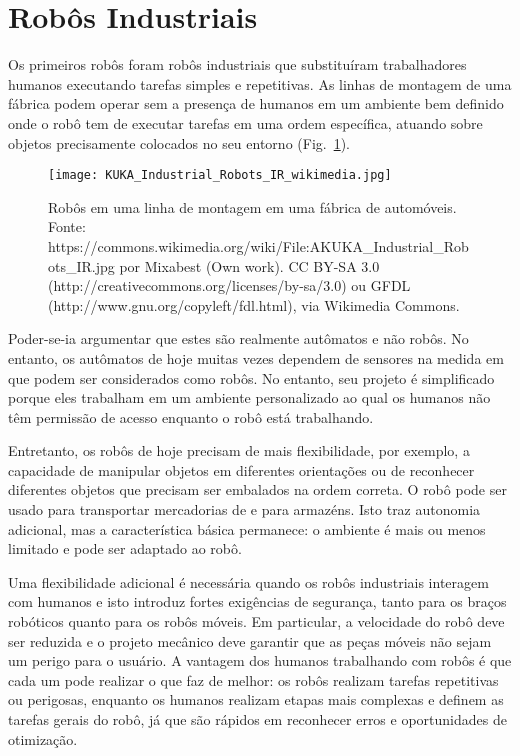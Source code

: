 \section{Robôs Industriais}

Os primeiros robôs foram robôs industriais que substituíram trabalhadores humanos executando tarefas simples e repetitivas. As linhas de montagem de uma fábrica podem operar sem a presença de humanos em um ambiente bem definido onde o robô tem de executar tarefas em uma ordem específica, atuando sobre objetos precisamente colocados no seu entorno (Fig.~\ref{fig.assemblyline}). 

\begin{figure}
\begin{center}
\texttt{[image: KUKA\_Industrial\_Robots\_IR\_wikimedia.jpg]}
\end{center}
\caption{Robôs em uma linha de montagem em uma fábrica de automóveis. Fonte: https://commons.wikimedia.org/wiki/File:AKUKA\_Industrial\_Robots\_IR.jpg por Mixabest (Own work). CC BY-SA 3.0 (http://creativecommons.org/licenses/by-sa/3.0) ou GFDL (http://www.gnu.org/copyleft/fdl.html), via Wikimedia Commons.}\label{fig.assemblyline}
\end{figure}

Poder-se-ia argumentar que estes são realmente autômatos e não robôs. No entanto, os autômatos de hoje muitas vezes dependem de sensores na medida em que podem ser considerados como robôs. No entanto, seu projeto é simplificado porque eles trabalham em um ambiente personalizado ao qual os humanos não têm permissão de acesso enquanto o robô está trabalhando.

Entretanto, os robôs de hoje precisam de mais flexibilidade, por exemplo, a capacidade de manipular objetos em diferentes orientações ou de reconhecer diferentes objetos que precisam ser embalados na ordem correta. O robô pode ser usado para transportar mercadorias de e para  armazéns. Isto traz autonomia adicional, mas a característica básica permanece: o ambiente é mais ou menos limitado e pode ser adaptado ao robô.

Uma flexibilidade adicional é necessária quando os robôs industriais interagem com humanos e isto introduz fortes exigências de segurança, tanto para os braços robóticos quanto para os robôs móveis. Em particular, a velocidade do robô deve ser reduzida e o projeto mecânico deve garantir que as peças móveis não sejam um perigo para o usuário. A vantagem dos humanos trabalhando com robôs é que cada um pode realizar o que faz de melhor: os robôs realizam tarefas repetitivas ou perigosas, enquanto os humanos realizam etapas mais complexas e definem as tarefas gerais do robô, já que são rápidos em reconhecer erros e oportunidades de otimização.

